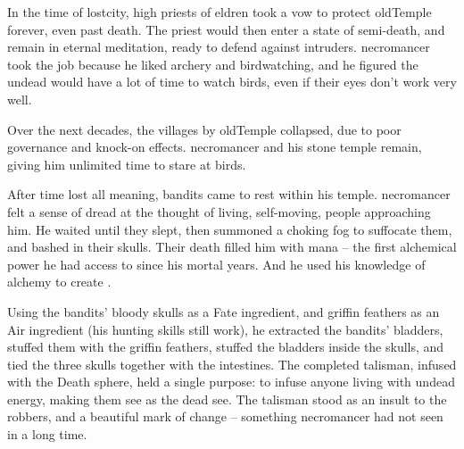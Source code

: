 
\label{necroStory}
\begin{exampletext}
  \noindent
  In the time of \gls{lostcity}, high priests of \gls{eldren} took a vow to protect \gls{oldTemple} forever, even past death.
  The priest would then enter a state of semi-death, and remain in eternal meditation, ready to defend against intruders.
  \Gls{necromancer} took the job because he liked archery and birdwatching, and he figured the undead would have a lot of time to watch birds, even if their eyes don't work very well.%


  Over the next decades, the \glspl{village} by \gls{oldTemple} collapsed, due to poor governance and knock-on effects.
  \Gls{necromancer} and his stone temple remain, giving him unlimited time to stare at birds.

  After time lost all meaning, bandits came to rest within his temple.
  \Gls{necromancer} felt a sense of dread at the thought of living, self-moving, people approaching him.
  He waited until they slept, then summoned a choking fog to suffocate them, and bashed in their skulls.
  Their death filled him with mana -- the first alchemical power he had access to since his mortal years.
  And he used his knowledge of \gls{alchemy} to create .

  Using the bandits' bloody skulls as a Fate \gls{ingredient}, and griffin feathers as an Air \gls{ingredient} (his hunting skills still work), he extracted the bandits' bladders, stuffed them with the griffin feathers, stuffed the bladders inside the skulls, and tied the three skulls together with the intestines.
  The completed \gls{talisman}, infused with the Death \gls{sphere}, held a single purpose: to infuse anyone living with undead energy, making them see as the dead see.
  The \gls{talisman} stood as an insult to the robbers, and a beautiful mark of change -- something \gls{necromancer} had not seen in a long time.


\end{exampletext}
